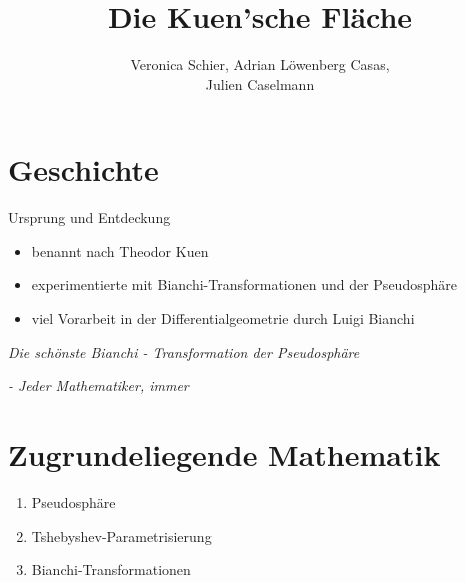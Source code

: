 \documentclass[12pt]{beamer}
\author{Veronica Schier, Adrian Löwenberg Casas, \\Julien Caselmann}
\title{Die Kuen'sche Fläche}
\begin{document}
\begin{frame}
\titlepage
\end{frame}

\begin{frame}

\tableofcontents

\end{frame}

\section{Geschichte}
\begin{frame}{Ursprung und Entdeckung}

\begin{itemize}
\item benannt nach Theodor Kuen 
\item experimentierte mit Bianchi-Transformationen und der Pseudosphäre
\item viel Vorarbeit in der Differentialgeometrie durch Luigi Bianchi
\end{itemize}

\end{frame}

\begin{frame}

\begin{center}
\textit{\glqq Die schönste Bianchi - Transformation der Pseudosphäre\grqq}
\end{center}

\begin{tiny}
\begin{flushright}
\textit{- Jeder Mathematiker, immer\phantom{aaa}}
\end{flushright}
\end{tiny}

\end{frame}

\section{Zugrundeliegende Mathematik}
\begin{frame}
\begin{enumerate}
\item Pseudosphäre
\item Tshebyshev-Parametrisierung
\item Bianchi-Transformationen
\end{enumerate}
\end{frame}
\end{document}
